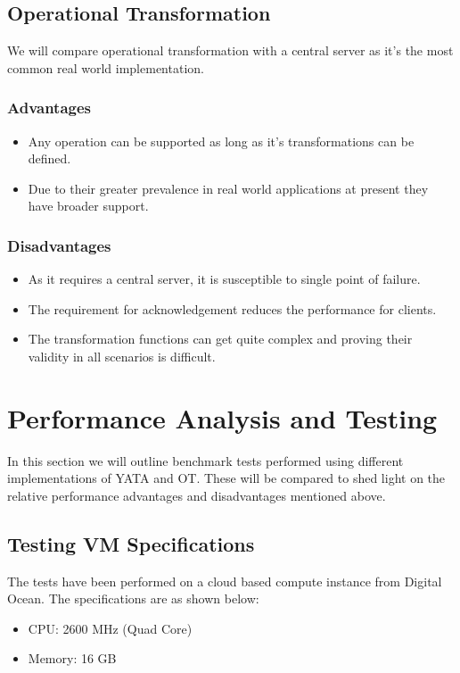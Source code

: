 \documentclass[12pt]{article}
\begin{document}
  \subsection{Operational Transformation}
  We will compare operational transformation with a central server as it's the most common real world implementation.

  \subsubsection{Advantages}
  \begin{itemize}
    \item Any operation can be supported as long as it's transformations can be defined.
    \item Due to their greater prevalence in real world applications at present they have broader support.
  \end{itemize}

  \subsubsection{Disadvantages}
  \begin{itemize}
    \item As it requires a central server, it is susceptible to single point of failure.
    \item The requirement for acknowledgement reduces the performance for clients.
    \item The transformation functions can get quite complex and proving their validity in all scenarios is difficult.
  \end{itemize}

  \section{Performance Analysis and Testing}
  In this section we will outline benchmark tests performed using different implementations of YATA and OT.
  These will be compared to shed light on the relative performance advantages and disadvantages mentioned above.
  
  \subsection{Testing VM Specifications}
  The tests have been performed on a cloud based compute instance from Digital Ocean.
  The specifications are as shown below:
  \begin{itemize}
    \item CPU: 2600 MHz (Quad Core)
    \item Memory: 16 GB
  \end{itemize}
\end{document}

